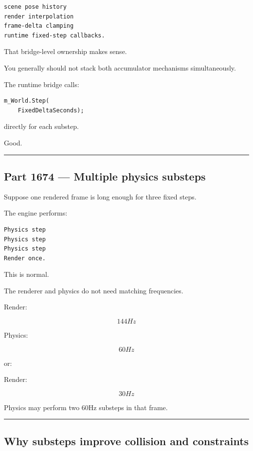 \begin{verbatim}
scene pose history
render interpolation
frame-delta clamping
runtime fixed-step callbacks.
\end{verbatim}

That bridge-level ownership makes sense.

You generally should not stack both accumulator mechanisms simultaneously.

The runtime bridge calls:

\begin{verbatim}
m_World.Step(
    FixedDeltaSeconds);
\end{verbatim}

directly for each substep.

Good.

\begin{center}\rule{0.5\linewidth}{0.5pt}\end{center}

\subsection{Part 1674 --- Multiple physics substeps}\label{06-engine-ii-ch037-part-1674-multiple-physics-substeps}

Suppose one rendered frame is long enough for three fixed steps.

The engine performs:

\begin{verbatim}
Physics step
Physics step
Physics step
Render once.
\end{verbatim}

This is normal.

The renderer and physics do not need matching frequencies.

Render:

\[
144Hz
\]

Physics:

\[
60Hz
\]

or:

Render:

\[
30Hz
\]

Physics may perform two 60Hz substeps in that frame.

\begin{center}\rule{0.5\linewidth}{0.5pt}\end{center}

\subsection{Why substeps improve collision and constraints}\label{06-engine-ii-ch037-why-substeps-improve-collision-and-constraints}

